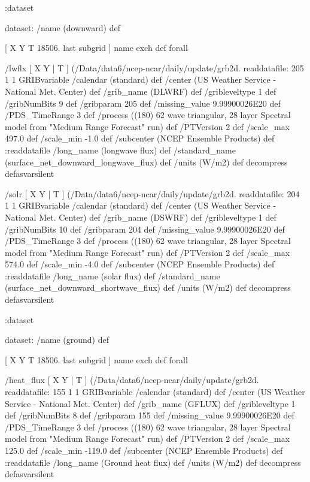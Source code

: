 \begin{ingrid}
  :dataset

  dataset: /name (downward) def

   [ X Y T 18506. last subgrid ] { name exch def } forall

    /lwflx { [ X Y | T ] (/Data/data6/ncep-ncar/daily/update/grb2d.%
    readdatafile:
    205 1 1 GRIBvariable
    /calendar (standard) def
    /center (US Weather Service - National Met. Center) def
    /grib_name (DLWRF) def
    /gribleveltype 1 def
    /gribNumBits 9 def
    /gribparam 205 def
    /missing_value 9.99900026E20 def 
    /PDS_TimeRange 3 def
    /process ((180) 62 wave triangular, 28 layer Spectral model from "Medium Range Forecast" run) def
    /PTVersion 2 def
    /scale_max 497.0 def
    /scale_min -1.0 def
    /subcenter (NCEP Ensemble Products) def
    :readdatafile
    /long_name (longwave flux) def
    /standard_name (surface_net_downward_longwave_flux) def
    /units (W/m2) def
    decompress
    } defasvarsilent

    /solr { [ X Y | T ] (/Data/data6/ncep-ncar/daily/update/grb2d.%
    readdatafile:
    204 1 1 GRIBvariable
    /calendar (standard) def
    /center (US Weather Service - National Met. Center) def
    /grib_name (DSWRF) def
    /gribleveltype 1 def
    /gribNumBits 10 def
    /gribparam 204 def
    /missing_value 9.99900026E20 def 
    /PDS_TimeRange 3 def
    /process ((180) 62 wave triangular, 28 layer Spectral model from "Medium Range Forecast" run) def
    /PTVersion 2 def
    /scale_max 574.0 def
    /scale_min -4.0 def
    /subcenter (NCEP Ensemble Products) def
    :readdatafile
    /long_name (solar flux) def
    /standard_name (surface_net_downward_shortwave_flux) def
    /units (W/m2) def
    decompress
    } defasvarsilent

  :dataset

  dataset: /name (ground) def

   [ X Y T 18506. last subgrid ] { name exch def } forall

    /heat_flux { [ X Y | T ] (/Data/data6/ncep-ncar/daily/update/grb2d.%
    readdatafile:
    155 1 1 GRIBvariable
    /calendar (standard) def
    /center (US Weather Service - National Met. Center) def
    /grib_name (GFLUX) def
    /gribleveltype 1 def
    /gribNumBits 8 def
    /gribparam 155 def
    /missing_value 9.99900026E20 def 
    /PDS_TimeRange 3 def
    /process ((180) 62 wave triangular, 28 layer Spectral model from "Medium Range Forecast" run) def
    /PTVersion 2 def
    /scale_max 125.0 def
    /scale_min -119.0 def
    /subcenter (NCEP Ensemble Products) def
    :readdatafile
    /long_name (Ground heat flux) def
    /units (W/m2) def
    decompress
    } defasvarsilent


\end{ingrid}
